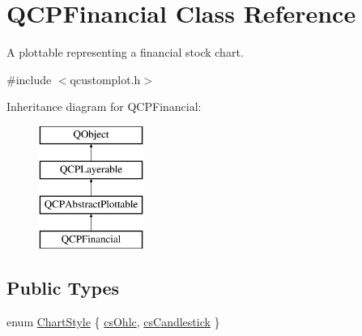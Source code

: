 \hypertarget{class_q_c_p_financial}{}\section{Q\+C\+P\+Financial Class Reference}
\label{class_q_c_p_financial}


A plottable representing a financial stock chart.  




{\ttfamily \#include $<$qcustomplot.\+h$>$}

Inheritance diagram for Q\+C\+P\+Financial\+:\begin{figure}[H]
\begin{center}
\leavevmode
\includegraphics[height=4.000000cm]{class_q_c_p_financial}
\end{center}
\end{figure}
\subsection*{Public Types}
\begin{DoxyCompactItemize}
\item 
enum \hyperlink{class_q_c_p_financial_a0f800e21ee98d646dfc6f8f89d10ebfb}{Chart\+Style} \{ \hyperlink{class_q_c_p_financial_a0f800e21ee98d646dfc6f8f89d10ebfba3a516016c9298d3e95dd82aa203c4390}{cs\+Ohlc}, 
\hyperlink{class_q_c_p_financial_a0f800e21ee98d646dfc6f8f89d10ebfbac803cbd39f26e3f206bcc7028679e62f}{cs\+Candlestick}
 \}
\end{DoxyCompactItemize}
